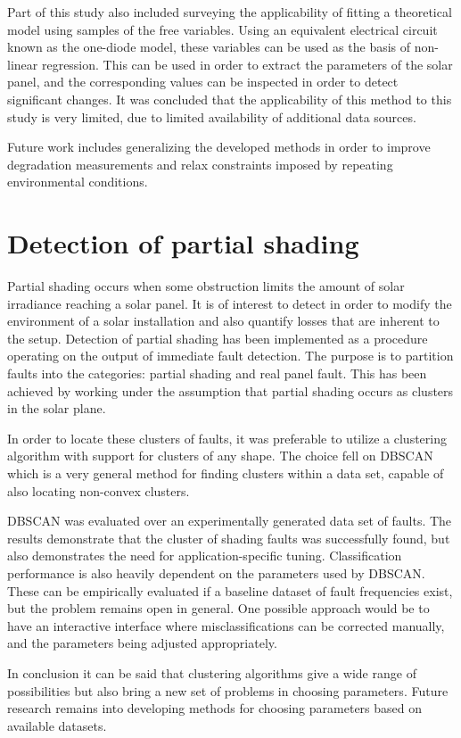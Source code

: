 Part of this study also included surveying the applicability of fitting a theoretical model using samples of the free variables.
Using an equivalent electrical circuit known as the one-diode model, these variables can be used as the basis of non-linear regression.
This can be used in order to extract the parameters of the solar panel, and the corresponding values can be inspected in order to detect significant changes.
It was concluded that the applicability of this method to this study is very limited, due to limited availability of additional data sources.

Future work includes generalizing the developed methods in order to improve degradation measurements and relax constraints imposed by repeating environmental conditions.

\section{Detection of partial shading}
Partial shading occurs when some obstruction limits the amount of solar irradiance reaching a solar panel.
It is of interest to detect in order to modify the environment of a solar installation and also quantify losses that are inherent to the setup.
Detection of partial shading has been implemented as a procedure operating on the output of immediate fault detection.
The purpose is to partition faults into the categories: partial shading and real panel fault.
This has been achieved by working under the assumption that partial shading occurs as clusters in the solar plane.

In order to locate these clusters of faults, it was preferable to utilize a clustering algorithm with support for clusters of any shape.
The choice fell on DBSCAN which is a very general method for finding clusters within a data set, capable of also locating non-convex clusters.

DBSCAN was evaluated over an experimentally generated data set of faults.
The results demonstrate that the cluster of shading faults was successfully found, but also demonstrates the need for application-specific tuning.
Classification performance is also heavily dependent on the parameters used by DBSCAN.
These can be empirically evaluated if a baseline dataset of fault frequencies exist, but the problem remains open in general.
One possible approach would be to have an interactive interface where misclassifications can be corrected manually, and the parameters being adjusted appropriately.

In conclusion it can be said that clustering algorithms give a wide range of possibilities but also bring a new set of problems in choosing parameters.
Future research remains into developing methods for choosing parameters based on available datasets.




